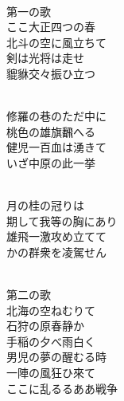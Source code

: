 \documentclass[10pt,b5j]{tarticle} %
\begin{document}
\vspace{1.5em} %
\newcommand{\linespace}{0.5em} %
\newcommand{\blocksize}{0.5\hsize} %
\newcommand{\itemmargin}{3em} %
\begin{enumerate} %
    \setlength{\itemindent}{\itemmargin} %
    \begin{minipage}[c]{\blocksize}
    
        \vspace{\linespace}
        \item~\\
        第一の歌\\
        ここ大正四つの春\\
        北斗の空に風立ちて\\
        剣は光将は走せ\\
        貔貅交々振ひ立つ
        
    \end{minipage}
    \begin{minipage}[c]{\blocksize}
        
        \vspace{\linespace}
        \item~\\
        修羅の巷のただ中に\\
        桃色の雄旗飜へる\\
        健児一百血は湧きて\\
        いざ中原の此一挙
        
    \end{minipage}
    \begin{minipage}[c]{\blocksize}
        
        \vspace{\linespace}
        \item~\\
        月の桂の冠りは\\
        期して我等の胸にあり\\
        雄飛一激攻め立てて\\
        かの群衆を凌駕せん
        
    \end{minipage}
    \begin{minipage}[c]{\blocksize}
        
        \vspace{\linespace}
        \item~\\
        第二の歌\\
        北海の空ねむりて\\
        石狩の原春静か\\
        手稲の夕べ雨白く\\
        男児の夢の醒むる時\\
        一陣の風狂ひ來て\\
        ここに乱るるああ戦争
        

\end{minipage}
\end{enumerate}
\end{document}
